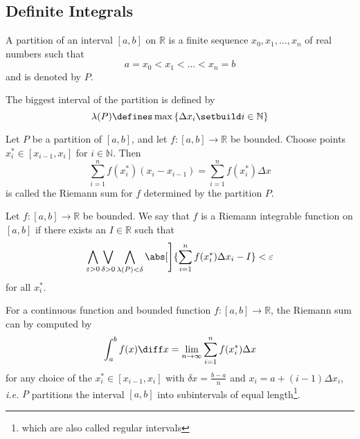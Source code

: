 \subsection{Definite Integrals}\label{subsec-definite-integrals}

\begin{definition}\label{def-partition-of-an-interval}
	A partition of an interval $[a,b]$ on $\mathbb{R}$ is a finite sequence
	$x_0,x_1,\dots,x_n$ of real numbers such that
	\begin{equation}\label{eq-partition-of-an-interval}
		a = x_0 < x_1 < \dots < x_n = b
	\end{equation}
	and is denoted by $P$.
\end{definition}

\begin{definition}\label{def-max-partition}
	The biggest interval of the partition is defined by
	\begin{equation}\label{eq-max-partition}
		\lambda(P) \defines \max\left\{\Delta x_i \setbuild i\in\mathbb{N}\right\}
	\end{equation}
\end{definition}

\begin{definition}\label{def-riemann-sum}
	Let $P$ be a partition of $[a,b]$, and let $f:[a,b]\to\mathbb{R}$ be bounded.
	Choose points $x_i^*\in[x_{i-1},x_i]$ for $i\in\mathbb{N}$. Then
	\begin{equation}\label{eq-riemann-sum}
		\sum_{i=1}^n f(x_i^*)(x_i-x_{i-1}) = \sum_{i=1}^n f(x_i^*)\Delta x
	\end{equation}
	is called the Riemann sum for $f$ determined by the partition $P$.
\end{definition}

\begin{definition}\label{def-riemann-integrable}
	Let $f:[a,b]\to\mathbb{R}$ be bounded. We say that $f$ is a Riemann integrable
	function on $[a,b]$ if there exists an $I\in\mathbb{R}$ such that
	\begin{equation}
		\bigwedge_{\varepsilon>0}\bigvee_{\delta>0}\bigwedge_{\lambda(P)<\delta}
		\abs[\Bigg]{\sum_{i=1}^n f(x_i^*)\Delta x_i - I}<\varepsilon
	\end{equation}
	for all $x_i^*$.
\end{definition}

\begin{definition}\label{def-definite-integral}
	For a continuous function and bounded function $f:[a,b]\to\mathbb{R}$,
	the Riemann sum can by computed by
	\begin{equation}\label{eq-definite-integral}
		\int_a^b f(x) \diff x = \lim_{n\to\infty}\sum_{i=1}^n f(x_i^*)\Delta x
	\end{equation}
	for any choice of the $x_i^*\in[x_{i-1},x_i]$ with $\delta x = \tfrac{b-a}{n}$
	and $x_i = a + (i-1)\Delta x_i$, \textit{i.e.} $P$ partitions the interval $[a,b]$
	into subintervals of equal length\footnote{which are also called regular intervals}.
\end{definition}

